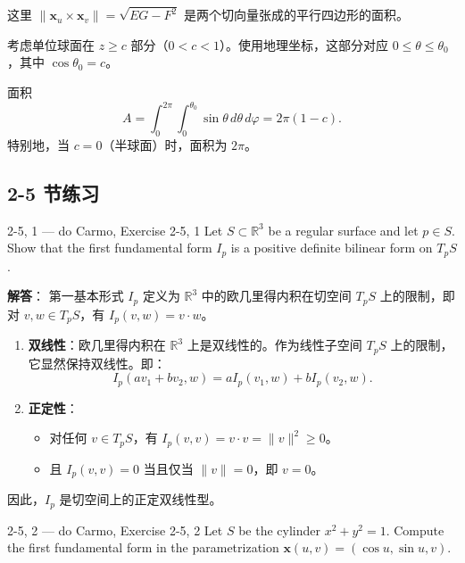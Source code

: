 这里 $\|\mathbf{x}_u \times \mathbf{x}_v\| = \sqrt{EG - F^2}$ 是两个切向量张成的平行四边形的面积。

\begin{Example}[球冠的面积]\label{ex:sphere-cap-area}
考虑单位球面在 $z \geq c$ 部分（$0 < c < 1$）。使用地理坐标，这部分对应 $0 \leq \theta \leq \theta_0$，其中 $\cos\theta_0 = c$。

面积
\[
A = \int_0^{2\pi} \int_0^{\theta_0} \sin\theta\, d\theta\, d\varphi = 2\pi(1 - c).
\]
特别地，当 $c = 0$（半球面）时，面积为 $2\pi$。
\end{Example}

\subsection*{2-5 节练习}

\begin{exercise}{2-5, 1 — do Carmo, Exercise 2-5, 1}
Let $S \subset \mathbb{R}^3$ be a regular surface and let $p \in S$. Show that the first fundamental form $I_p$ is a positive definite bilinear form on $T_pS$.
\end{exercise}

\begin{solution}
\textbf{解答}：
第一基本形式 $I_p$ 定义为 $\mathbb{R}^3$ 中的欧几里得内积在切空间 $T_pS$ 上的限制，即对 $v, w \in T_pS$，有 $I_p(v, w) = v \cdot w$。

\begin{enumerate}
    \item \textbf{双线性}：欧几里得内积在 $\mathbb{R}^3$ 上是双线性的。作为线性子空间 $T_pS$ 上的限制，它显然保持双线性。即：
    \[
    I_p(a v_1 + b v_2, w) = a I_p(v_1, w) + b I_p(v_2, w).
    \]
    \item \textbf{正定性}：
    \begin{itemize}
        \item 对任何 $v \in T_pS$，有 $I_p(v, v) = v \cdot v = \|v\|^2 \geq 0$。
        \item 且 $I_p(v, v) = 0$ 当且仅当 $\|v\| = 0$，即 $v = 0$。
    \end{itemize}
\end{enumerate}
因此，$I_p$ 是切空间上的正定双线性型。
\end{solution}

\begin{exercise}{2-5, 2 — do Carmo, Exercise 2-5, 2}
Let $S$ be the cylinder $x^2 + y^2 = 1$. Compute the first fundamental form in the parametrization $\mathbf{x}(u,v) = (\cos u, \sin u, v)$.
\end{exercise}

